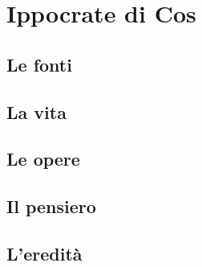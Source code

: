 \chapter{Ippocrate di Cos}

\section{Le fonti}

\section{La vita}

\section{Le opere}

\section{Il pensiero}

\section{L'eredità}
